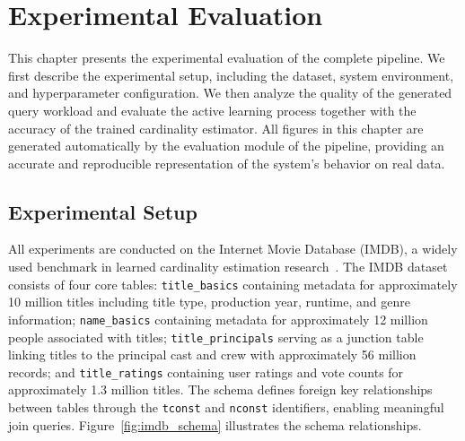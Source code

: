\chapter{Experimental Evaluation}
\label{chap:experiments}
\pagestyle{plain}

\graphicspath{{graphs/}}

This chapter presents the experimental evaluation of the complete pipeline. We first describe the experimental setup, including the dataset, system environment, and hyperparameter configuration. We then analyze the quality of the generated query workload and evaluate the active learning process together with the accuracy of the trained cardinality estimator. All figures in this chapter are generated automatically by the evaluation module of the pipeline, providing an accurate and reproducible representation of the system's behavior on real data.


\section{Experimental Setup}

All experiments are conducted on the Internet Movie Database (IMDB), a widely used benchmark in learned cardinality estimation research~\cite{DBLP:conf/cidr/KipfKRLBK19}. The IMDB dataset consists of four core tables: \texttt{title\_basics} containing metadata for approximately 10 million titles including title type, production year, runtime, and genre information; \texttt{name\_basics} containing metadata for approximately 12 million people associated with titles; \texttt{title\_principals} serving as a junction table linking titles to the principal cast and crew with approximately 56 million records; and \texttt{title\_ratings} containing user ratings and vote counts for approximately 1.3 million titles. The schema defines foreign key relationships between tables through the \texttt{tconst} and \texttt{nconst} identifiers, enabling meaningful join queries. Figure~\ref{fig:imdb_schema} illustrates the schema relationships.

